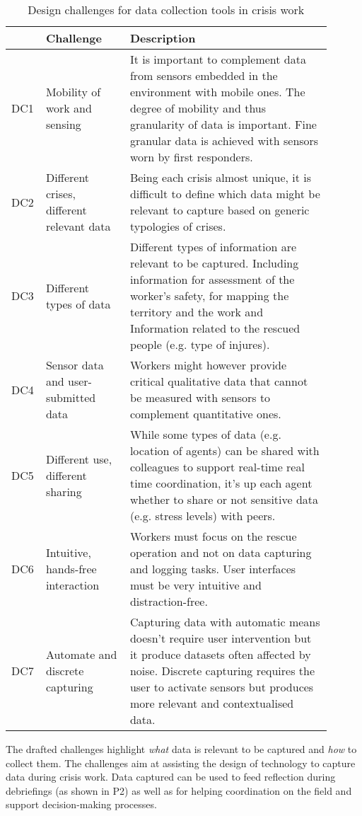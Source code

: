 \begin{table}
	[htb] \centering \caption{Design challenges for data collection tools in crisis work} \label{tab:design-challenges} 
	\begin{tabular}
		{@{}p{0.05\linewidth}p{0.25\linewidth}p{0.60\linewidth}@{}} \toprule & Challenge & Description \\
		\midrule DC1 & Mobility of work and sensing & It is important to complement data from sensors embedded in the environment with mobile ones. The degree of mobility and thus granularity of data is important. Fine granular data is achieved with sensors worn by first responders. \\
		DC2 & Different crises, different relevant data & Being each crisis almost unique, it is difficult to define which data might be relevant to capture based on generic typologies of crises. \\
		DC3 & Different types of data & Different types of information are relevant to be captured. Including information for assessment of the worker’s safety, for mapping the territory and the work and Information related to the rescued people (e.g. type of injures). \\
		DC4 & Sensor data and user-submitted data & Workers might however provide critical qualitative data that cannot be measured with sensors to complement quantitative ones. \\
		DC5 & Different use, different sharing & While some types of data (e.g. location of agents) can be shared with colleagues to support real-time real time coordination, it's up each agent whether to share or not sensitive data (e.g. stress levels) with peers. \\
		DC6 & Intuitive, hands-free interaction & Workers must focus on the rescue operation and not on data capturing and logging tasks. User interfaces must be very intuitive and distraction-free. \\
		DC7 & Automate and discrete capturing & Capturing data with automatic means doesn't require user intervention but it produce datasets often affected by noise. Discrete capturing requires the user to activate sensors but produces more relevant and contextualised data. \\
		\bottomrule 
	\end{tabular}
\end{table}

The drafted challenges highlight \emph{what} data is relevant to be captured and \emph{how} to collect them. The challenges aim at assisting the design of technology to capture data during crisis work. Data captured can be used to feed reflection during debriefings (as shown in P2) as well as for helping coordination on the field and support decision-making processes.

